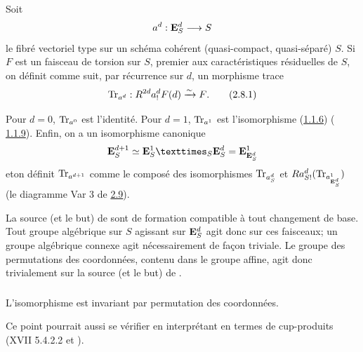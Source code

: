 \documentclass[10pt]{../fichiers-configuration-latex/smfart}
\begin{document}
\subsection{}
Soit
$$
a^{d}:\mathbf{E}^{d}_{S}\longrightarrow S
$$
le fibré vectoriel type sur un schéma cohérent (\ie quasi-compact,
quasi-séparé) $S$. Si $F$ est un faisceau de torsion sur $S$, premier
aux caractéristiques résiduelles de $S$, on définit comme suit, par
récurrence sur $d$, un morphisme trace
\begin{equation*}
\operatorname{Tr}_{a^d}:R^{2d}a^{d}_{!}F(d)\xrightarrow{\sim} F{}.\tag{2.8.1}
\end{equation*}

Pour $d=0$, $\operatorname{Tr}_{a^0}$ est l'identité. Pour $d=1$, $\operatorname{Tr}_{a^1}$
est l'isomorphisme (\hyperref[XVIII.prop1.1.6]{1.1.6}) (\cf
\hyperref[XVIII.lem1.1.9]{1.1.9}). Enfin, on a un isomorphisme canonique
$$
\EE^{d+1}_{S}\simeq\fprod{\EE^{1}_{S}}{\EE^{d}_{S}}{S}=\EE^{1}_{\EE_{S}^d}
$$
et\pageoriginale on définit $\operatorname{Tr}_{a^{d+1}}$ comme le composé des
isomorphismes $\operatorname{Tr}_{a^{d}_{S}}$ et
$Ra^{d}_{S!}(\operatorname{Tr}_{a^1_{\mathbf{E}^d_S}})$
(\cf le diagramme Var 3 de \hyperref[XVIII.thm2.9]{2.9}).

La source (et le but) de  sont de formation compatible à tout
changement de base. Tout groupe algébrique sur $S$ agissant sur
$\mathbf{E}^{d}_{S}$ agit donc sur ces faisceaux; un groupe algébrique
connexe agit nécessairement de façon triviale. Le groupe des
permutations des coordonnées, contenu dans le groupe affine, agit donc
trivialement sur la source (et le but) de .

\setcounter{subsubsection}{1}
\subsubsection{}
L'isomorphisme  est invariant par permutation des
coordonnées. 

Ce point pourrait aussi se vérifier en interprétant
 en termes 
de cup-produits (XVII 5.4.2.2 et ).
\end{document}
